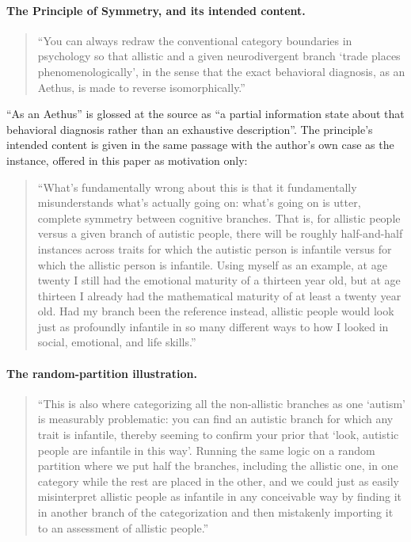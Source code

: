 \paragraph{The Principle of Symmetry, and its intended content.}
\begin{quote}
``You can always redraw the conventional category boundaries in psychology so that allistic and a given neurodivergent branch `trade places phenomenologically', in the sense that the exact behavioral diagnosis, as an Aethus, is made to reverse isomorphically.''
\end{quote}
``As an Aethus'' is glossed at the source as ``a partial information state about that behavioral diagnosis rather than an exhaustive description''. The principle's intended content is given in the same passage with the author's own case as the instance, offered in this paper as motivation only:
\begin{quote}
``What's fundamentally wrong about this is that it fundamentally misunderstands what's actually going on: what's going on is utter, complete symmetry between cognitive branches. That is, for allistic people versus a given branch of autistic people, there will be roughly half-and-half instances across traits for which the autistic person is infantile versus for which the allistic person is infantile. Using myself as an example, at age twenty I still had the emotional maturity of a thirteen year old, but at age thirteen I already had the mathematical maturity of at least a twenty year old. Had my branch been the reference instead, allistic people would look just as profoundly infantile in so many different ways to how I looked in social, emotional, and life skills.''
\end{quote}

\paragraph{The random-partition illustration.}
\begin{quote}
``This is also where categorizing all the non-allistic branches as one `autism' is measurably problematic: you can find an autistic branch for which any trait is infantile, thereby seeming to confirm your prior that `look, autistic people are infantile in this way'. Running the same logic on a random partition where we put half the branches, including the allistic one, in one category while the rest are placed in the other, and we could just as easily misinterpret allistic people as infantile in any conceivable way by finding it in another branch of the categorization and then mistakenly importing it to an assessment of allistic people.''
\end{quote}

